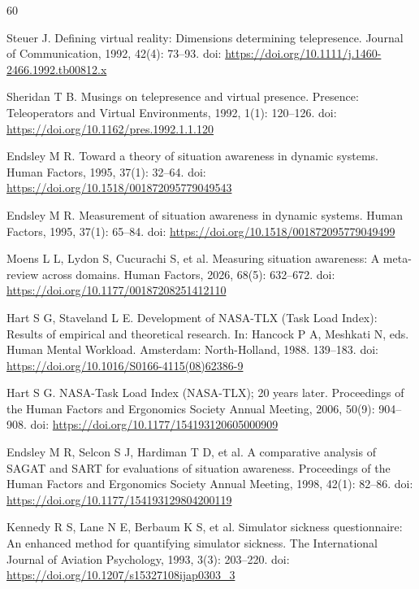 \documentclass[fleqn]{VRIH2025}
\begin{document}
\begin{thebibliography}{60}

Steuer J. Defining virtual reality: Dimensions determining telepresence. Journal of Communication, 1992, 42(4): 73--93. doi: \url{https://doi.org/10.1111/j.1460-2466.1992.tb00812.x}

Sheridan T B. Musings on telepresence and virtual presence. Presence: Teleoperators and Virtual Environments, 1992, 1(1): 120--126. doi: \url{https://doi.org/10.1162/pres.1992.1.1.120}

Endsley M R. Toward a theory of situation awareness in dynamic systems. Human Factors, 1995, 37(1): 32--64. doi: \url{https://doi.org/10.1518/001872095779049543}

Endsley M R. Measurement of situation awareness in dynamic systems. Human Factors, 1995, 37(1): 65--84. doi: \url{https://doi.org/10.1518/001872095779049499}

Moens L L, Lydon S, Cucurachi S, et al. Measuring situation awareness: A meta-review across domains. Human Factors, 2026, 68(5): 632--672. doi: \url{https://doi.org/10.1177/00187208251412110}

Hart S G, Staveland L E. Development of NASA-TLX (Task Load Index): Results of empirical and theoretical research. In: Hancock P A, Meshkati N, eds. Human Mental Workload. Amsterdam: North-Holland, 1988. 139--183. doi: \url{https://doi.org/10.1016/S0166-4115(08)62386-9}

Hart S G. NASA-Task Load Index (NASA-TLX); 20 years later. Proceedings of the Human Factors and Ergonomics Society Annual Meeting, 2006, 50(9): 904--908. doi: \url{https://doi.org/10.1177/154193120605000909}

Endsley M R, Selcon S J, Hardiman T D, et al. A comparative analysis of SAGAT and SART for evaluations of situation awareness. Proceedings of the Human Factors and Ergonomics Society Annual Meeting, 1998, 42(1): 82--86. doi: \url{https://doi.org/10.1177/154193129804200119}

Kennedy R S, Lane N E, Berbaum K S, et al. Simulator sickness questionnaire: An enhanced method for quantifying simulator sickness. The International Journal of Aviation Psychology, 1993, 3(3): 203--220. doi: \url{https://doi.org/10.1207/s15327108ijap0303_3}


\end{thebibliography}
\end{document}
